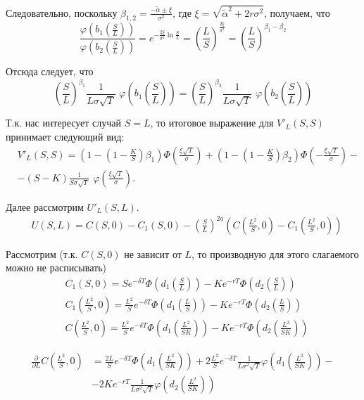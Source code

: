\documentclass[oneside,final,12pt]{article}
\begin{document}
Следовательно, поскольку $\beta_{1,2}=\frac{-\widetilde{\alpha}\pm\xi}{\sigma^2}$, где
$\xi = \sqrt{\widetilde{\alpha}^2 + 2r\sigma^2}$, получаем, что
$$
\frac{ \varphi\left(b_1\left(\frac{S}{L}\right)\right) }
     { \varphi\left(b_2\left(\frac{S}{L}\right)\right) } =
e^{- \frac{2 \xi}{\sigma^2} \ln \frac{S}{L}} = 
\left(\frac{L}{S}\right)^{\frac{2\xi}{\sigma^2}} =
\left(\frac{L}{S}\right)^{\beta_1-\beta_2}
$$

Отсюда следует, что 
$$
\left(  \frac{S}{L}\right)^{\beta_1} \frac{1}{L\sigma\sqrt{T}} \, \, \varphi\left(b_1\left(\frac{S}{L}\right)\right) = 
    \left( \frac{S}{L}\right)^{\beta_2} \frac{1}{L\sigma\sqrt{T}} \, \, \varphi\left(b_2\left(\frac{S}{L}\right)\right)
$$

Т.к. нас интересует случай $S=L$, то итоговое выражение для $V'_L(S,S)$ принимает следующий вид:
\begin{align*}
    & V'_L(S,S) = \left( 1 - \left(1-\frac{K}{S}\right)\beta_1  \right) 
     \Phi\left(\frac{\xi\sqrt{T}}{\sigma}\right)
    + \left( 1 - \left(1-\frac{K}{S}\right)\beta_2  \right) 
     \Phi\left(-\frac{\xi\sqrt{T}}{\sigma}\right) - \\
    & - (S-K) \frac{1}{S\sigma\sqrt{T}} \, \,\varphi\left( \frac{\xi\sqrt{T}}{\sigma}\right).
\end{align*}

Далее рассмотрим $U'_L(S,L)$.
\begin{align*}
    & U(S,L) = C(S,0)-C_1(S,0)-\left( \frac{S}{L} \right)^{2a} 
    \left( C\left( \frac{L^2}{S},0\right) - C_1\left( \frac{L^2}{S},0\right) \right)
\end{align*}

\noindent
Рассмотрим (т.к. $C(S,0)$ не зависит от $L$, то производную для этого слагаемого можно не расписывать)
\begin{align*}
    & C_1(S,0)= Se^{-\delta T} \Phi \left( d_1\left( \frac{S}{L}\right)\right) - Ke^{-rT} \Phi \left( d_2\left( \frac{S}{L}\right)\right) \\
    & C_1\left(\frac{L^2}{S},0\right)= \frac{L^2}{S}e^{-\delta T} \Phi \left( d_1\left( \frac{L}{S}\right)\right) - Ke^{-rT} \Phi \left( d_2\left( \frac{L}{S}\right)\right) \\
    & C\left(\frac{L^2}{S},0\right) = \frac{L^2}{S}e^{-\delta T} \Phi \left( d_1\left( \frac{L^2}{SK}\right)\right) - Ke^{-rT} \Phi \left( d_2\left( \frac{L^2}{SK}\right)\right)
\end{align*}

\begin{align*}
    \frac{\partial}{\partial L} C\left(\frac{L^2}{S},0\right) & = 
    \frac{2L}{S}e^{-\delta T} \Phi \left( d_1\left( \frac{L^2}{SK}\right)\right) + 2\frac{L^2}{S}e^{-\delta T}\frac{1}{L\sigma^2\sqrt{T}} \varphi\left(d_1\left( \frac{L^2}{SK}\right) \right) - \\
    & - 2Ke^{-rT} \frac{1}{L\sigma^2\sqrt{T}} 
    \varphi\left(d_2\left( \frac{L^2}{SK}\right) \right)
\end{align*}
\end{document}
